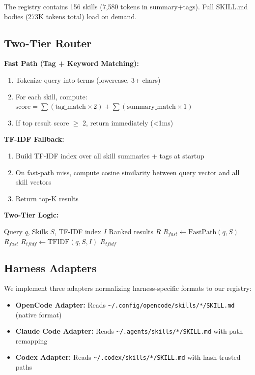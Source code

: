 \documentclass[11pt]{article}
\begin{document}
The registry contains 156 skills (7,580 tokens in summary+tags). Full SKILL.md bodies (273K tokens total) load on demand.

\subsection{Two-Tier Router}

\textbf{Fast Path (Tag + Keyword Matching):}
\begin{enumerate}
  \item Tokenize query into terms (lowercase, 3+ chars)
  \item For each skill, compute: $\text{score} = \sum(\text{tag\_match} \times 2) + \sum(\text{summary\_match} \times 1)$
  \item If top result score $\geq$ 2, return immediately (<1ms)
\end{enumerate}

\textbf{TF-IDF Fallback:}
\begin{enumerate}
  \item Build TF-IDF index over all skill summaries + tags at startup
  \item On fast-path miss, compute cosine similarity between query vector and all skill vectors
  \item Return top-K results
\end{enumerate}

\textbf{Two-Tier Logic:}
\begin{algorithm}
\caption{Two-Tier Skill Routing}
\begin{algorithmic}[1]
\REQUIRE Query $q$, Skills $S$, TF-IDF index $I$
\ENSURE Ranked results $R$
\STATE $R_{fast} \leftarrow \text{FastPath}(q, S)$
  \RETURN $R_{fast}$ 
\ENDIF
\STATE $R_{tfidf} \leftarrow \text{TFIDF}(q, S, I)$ 
\RETURN $R_{tfidf}$
\end{algorithmic}
\end{algorithm}

\subsection{Harness Adapters}

We implement three adapters normalizing harness-specific formats to our registry:

\begin{itemize}
  \item \textbf{OpenCode Adapter:} Reads \texttt{\textasciitilde/.config/opencode/skills/*/SKILL.md} (native format)
  \item \textbf{Claude Code Adapter:} Reads \texttt{\textasciitilde/.agents/skills/*/SKILL.md} with path remapping
  \item \textbf{Codex Adapter:} Reads \texttt{\textasciitilde/.codex/skills/*/SKILL.md} with hash-trusted paths
\end{itemize}
\end{document}
